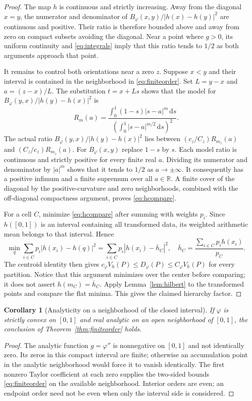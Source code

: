\documentclass[11pt]{article}
\newtheorem{corollary}[theorem]{Corollary}
\theoremstyle{definition}\newtheorem{definition}[theorem]{Definition}
\theoremstyle{remark}\newtheorem{remark}[theorem]{Remark}
\newcommand{\ph}{\varphi}
\newcommand{\B}{B_{\ph}}
\newcommand{\D}{D_{\ph}}
\newcommand{\R}{\mathbb R}
\newcommand{\rd}{\,\mathrm d}
\begin{document}
\begin{proof}
The map $h$ is continuous and strictly increasing. Away from the diagonal $x=y$, the numerator and denominator of $\B(x,y)/|h(x)-h(y)|^2$ are continuous and positive. Their ratio is therefore bounded above and away from zero on compact subsets avoiding the diagonal. Near a point where $g>0$, its uniform continuity and \eqref{eq:integrals} imply that this ratio tends to $1/2$ as both arguments approach that point.

It remains to control both orientations near a zero $z$. Suppose $x<y$ and their interval is contained in the neighborhood in \eqref{eq:finiteorder}. Set $L=y-x$ and $a=(z-x)/L$. The substitution $t=x+Ls$ shows that the model for $\B(y,x)/|h(y)-h(x)|^2$ is
\begin{equation}
R_m(a)=\frac{\int_0^1(1-s)|s-a|^m\rd s}
{\left(\int_0^1|s-a|^{m/2}\rd s\right)^2}.
\label{eq:modelratio}
\end{equation}
The actual ratio $\B(y,x)/|h(y)-h(x)|^2$ lies between $(c_z/C_z)R_{m_z}(a)$ and $(C_z/c_z)R_{m_z}(a)$. For $\B(x,y)$ replace $1-s$ by $s$. Each model ratio is continuous and strictly positive for every finite real $a$. Dividing its numerator and denominator by $|a|^m$ shows that it tends to $1/2$ as $a\to\pm\infty$. It consequently has a positive infimum and a finite supremum over all $a\in\R$. A finite cover of the diagonal by the positive-curvature and zero neighborhoods, combined with the off-diagonal compactness argument, proves \eqref{eq:hcompare}.

For a cell $C$, minimize \eqref{eq:hcompare} after summing with weights $p_i$. Since $h([0,1])$ is an interval containing all transformed data, its weighted arithmetic mean belongs to that interval. Hence
\[
\min_q\sum_{i\in C}p_i|h(x_i)-h(q)|^2
=\sum_{i\in C}p_i|h(x_i)-\overline h_C|^2,
\quad
\overline h_C=\frac{\sum_{i\in C}p_ih(x_i)}{p_C}.
\]
The centroid identity then gives $c_\ph V_h(P)\le\D(P)\le C_\ph V_h(P)$ for every partition. Notice that this argument minimizes over the center before comparing; it does not assert $h(m_C)=\overline h_C$. Apply Lemma~\ref{lem:hilbert} to the transformed points and compare the flat minima. This gives the claimed hierarchy factor.
\end{proof}

\begin{corollary}[Analyticity on a neighborhood of the closed interval]
\label{cor:analytic}
If $\ph$ is strictly convex on $[0,1]$ and real analytic on an open neighborhood of $[0,1]$, the conclusion of Theorem~\ref{thm:finiteorder} holds.
\end{corollary}
\begin{proof}
The analytic function $g=\ph''$ is nonnegative on $[0,1]$ and not identically zero. Its zeros in this compact interval are finite; otherwise an accumulation point in the analytic neighborhood would force it to vanish identically. The first nonzero Taylor coefficient at each zero supplies the two-sided bounds \eqref{eq:finiteorder} on the available neighborhood. Interior orders are even; an endpoint order need not be even when only the interval side is considered.
\end{proof}
\end{document}
